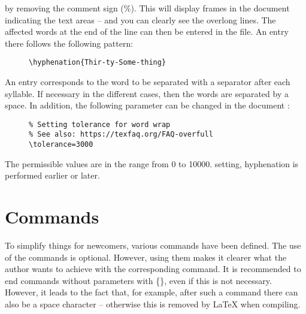 by removing the comment sign (\%). This will display frames in the document
indicating the text areas -- and you can clearly see the overlong lines. The
affected words at the end of the line can then be entered in the
 file. An entry there follows the following
pattern:

\begin{figure}[H]
    \small
    \centering
    \begin{BVerbatim}
\hyphenation{Thir-ty-Some-thing}
    \end{BVerbatim}
\end{figure}

An entry corresponds to the word to be separated with a separator after each
syllable. If necessary in the different cases, then the words are separated
by a space. In addition, the following parameter can be changed in the document
:

\begin{figure}[H]
    \small
    \centering
    \begin{BVerbatim}
\tolerance=3000
    \end{BVerbatim}
\end{figure}

The permissible values are in the range from 0 to 10000. setting, hyphenation
is performed earlier or later.

\section{Commands}
\label{sec:Commands}

To simplify things for newcomers, various commands have been defined. The use
of the commands is optional. However, using them makes it clearer what the
author wants to achieve with the corresponding command. It is recommended to
end commands without parameters with \{\}, even if this is not necessary.
However, it leads to the fact that, for example, after such a command there
can also be a space character -- otherwise this is removed by \LaTeX{} when
compiling.

